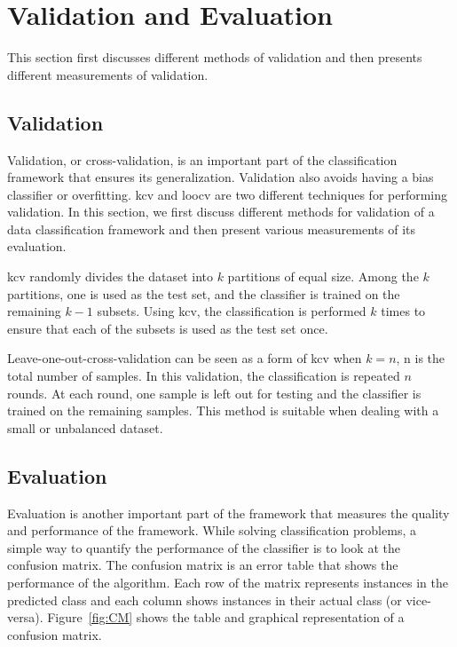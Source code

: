\section{Validation and Evaluation} \label{sec:chp2-sec7}
This section first discusses different methods of validation and then presents different measurements of validation. 
\subsection{Validation}
Validation, or cross-validation, is an important part of the classification framework that ensures its generalization.
Validation also avoids having a bias classifier or overfitting. 
\acf{kcv} and \acf{loocv} are two different techniques for performing validation. 
In this section, we first discuss different methods for validation of a data classification framework and then present various measurements of its evaluation. 

\acl{kcv} randomly divides the dataset into $k$ partitions of equal size.
Among the $k$ partitions, one is used as the test set, and the classifier is trained on the remaining $k-1$ subsets. 
Using \ac{kcv}, the classification is performed $k$ times to ensure that each of the subsets is used as the test set once.

Leave-one-out-cross-validation can be seen as a form of \ac{kcv} when $k = n$, n is the total number of samples.
In this validation, the classification is repeated $n$ rounds. 
At each round, one sample is left out for testing and the classifier is trained on the remaining samples.
This method is suitable when dealing with a small or unbalanced dataset.    

\subsection{Evaluation}
Evaluation is another important part of the framework that measures the quality and performance of the framework.
While solving classification problems, a simple way to quantify the performance of the classifier is to look at the confusion matrix.
The confusion matrix is an error table that shows the performance of the algorithm.
Each row of the matrix represents instances in the predicted class and each column shows instances in their actual class (or vice-versa). 
Figure~\ref{fig:CM} shows the table and graphical representation of a confusion matrix.

